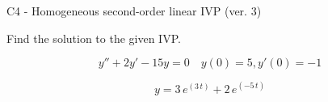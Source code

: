\begin{exercise}
  \begin{exerciseTitle}C4 - Homogeneous second-order linear IVP (ver. 3)\end{exerciseTitle}
  \begin{exerciseStatement}
    
Find the solution to the given IVP.

    
\[y''+2y'-15y = 0 \hspace{1em} y(0) = 5 , y'(0) = -1\]

  \end{exerciseStatement}
  \begin{exerciseAnswer}
    
\[y= 3 \, e^{\left(3 \, t\right)} + 2 \, e^{\left(-5 \, t\right)}\]

  \end{exerciseAnswer}
\end{exercise}